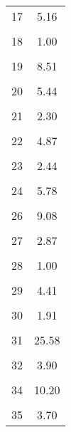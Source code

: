 \begin{table}[htbp]
\begin{tabular}{l*{1}{c}}
17                  &        5.16\\
                    &            \\
[1em]
18                  &        1.00\\
                    &            \\
[1em]
19                  &        8.51\\
                    &            \\
[1em]
20                  &        5.44\\
                    &            \\
[1em]
21                  &        2.30\\
                    &            \\
[1em]
22                  &        4.87\\
                    &            \\
[1em]
23                  &        2.44\\
                    &            \\
[1em]
24                  &        5.78\\
                    &            \\
[1em]
26                  &        9.08\\
                    &            \\
[1em]
27                  &        2.87\\
                    &            \\
[1em]
28                  &        1.00\\
                    &            \\
[1em]
29                  &        4.41\\
                    &            \\
[1em]
30                  &        1.91\\
                    &            \\
[1em]
31                  &       25.58\\
                    &            \\
[1em]
32                  &        3.90\\
                    &            \\
[1em]
34                  &       10.20\\
                    &            \\
[1em]
35                  &        3.70\\

\end{tabular}
\end{table}
